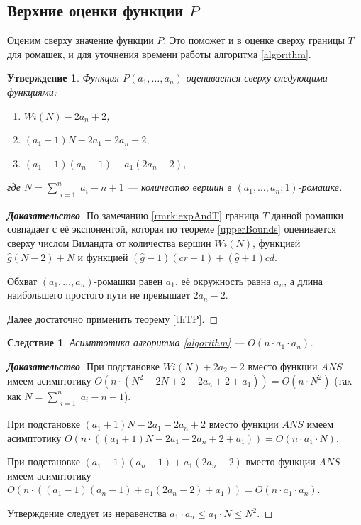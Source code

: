 \documentclass[12pt]{article}
\newtheorem{proposition}[theorem]{Утверждение}
\newtheorem{corollary}[theorem]{Следствие}
\begin{document}
\subsection{Верхние оценки функции $P$}
Оценим сверху значение функции $P$. Это поможет и в оценке сверху границы $T$ для ромашек, и для уточнения времени работы алгоритма \ref{algorithm}.

\begin{proposition}
\label{upperBoundsP}
Функция $P(a_1, \dots, a_n)$ оценивается сверху следующими функциями:
\begin{enumerate}
\item $Wi(N) - 2a_n + 2$,
\item $(a_1 + 1)N - 2a_1 - 2a_n + 2$,
\item $(a_1 - 1)(a_n - 1) + a_1(2a_n - 2)$,
\end{enumerate}
где $N = \sum\limits_{\substack{i=1}}^n a_i - n + 1$ --- количество вершин в $(a_1, \dots, a_n; 1)$-ромашке.
\end{proposition}
\begin{proof}[\textbf{Доказательство}]
По замечанию \ref{rmrk:expAndT} граница $T$ данной ромашки совпадает с её экспонентой, которая по теореме \ref{upperBounds} оценивается сверху числом Виландта от количества вершин $Wi(N)$, функцией $\hat{g}(N - 2) + N$ и функцией $(\hat{g} - 1)(cr - 1) + (\hat{g} + 1) cd$.

Обхват $(a_1, \dots, a_n)$-ромашки равен $a_1$, её окружность равна $a_n$, а длина наибольшего простого пути не превышает $2a_n - 2$.

Далее достаточно применить теорему \ref{thTP}.
\end{proof}

\begin{corollary}
Асимптотика алгоритма \ref{algorithm} --- $O(n \cdot a_1 \cdot a_n)$.
\end{corollary}
\begin{proof}[\textbf{Доказательство}]
При подстановке $Wi(N) + 2a_2 - 2$ вместо функции $ANS$ имеем асимптотику $O(n \cdot (N^2 - 2N + 2 - 2a_n + 2 + a_1)) = O(n \cdot N^2)$ (так как $N = \sum\limits_{\substack{i=1}}^n a_i - n + 1$).

При подстановке $(a_1 + 1)N - 2a_1 - 2a_n + 2$ вместо функции $ANS$ имеем асимптотику $O(n \cdot ((a_1 + 1)N - 2a_1 - 2a_n + 2 + a_1)) = O(n \cdot a_1 \cdot N)$.

При подстановке $(a_1 - 1)(a_n - 1) + a_1(2a_n - 2)$ вместо функции $ANS$ имеем асимптотику $O(n \cdot ((a_1 - 1)(a_n - 1) + a_1(2a_n - 2) + a_1)) = O(n \cdot a_1 \cdot a_n)$.

Утверждение следует из неравенства $a_1 \cdot a_n \le a_1 \cdot N \le N^2$.
\end{proof}
\end{document}
